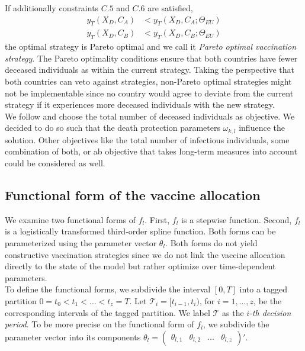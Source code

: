 If additionally constraints $C.5$ and $C.6$ are satisfied, 
\begin{align}
y_T(X_D, C_A) &< y_T(X_D, C_A; \Theta_{EU}) \tag{C.5} \\
y_T(X_D, C_B) &< y_T(X_D, C_B; \Theta_{EU}) \tag{C.6}
\end{align}
the optimal strategy is Pareto optimal and we call it \textit{Pareto optimal vaccination strategy}. The Pareto optimality conditions ensure that both countries have fewer deceased individuals as within the current strategy. Taking the perspective that both countries can veto against strategies, non-Pareto optimal strategies might not be implementable since no country would agree to deviate from the current strategy if it experiences more deceased individuals with the new strategy.\\

We follow \cite{Bertsimas.2020} and choose the total number of deceased individuals as objective. We decided to do so such that the death protection parameters $\omega_{k,l}$ influence the solution. Other objectives like the total number of infectious individuals, some combination of both, or ab objective that takes long-term measures into account could be considered as well.  \\

\subsection{Functional form of the vaccine allocation}
We examine two functional forms of $f_{l}$. First, $f_{l}$ is a stepwise function. Second, $f_{l}$ is a logistically transformed third-order spline function. Both forms can be parameterized using the parameter vector $\theta_l$. Both forms do not yield constructive vaccination strategies since we do not link the vaccine allocation directly to the state of the model but rather optimize over time-dependent parameters.\\

To define the functional forms, we subdivide the interval $[0,T]$ into a tagged partition $0=t_0 < t_1 < \dots < t_z = T$. Let $\mathcal{T}_i = [t_{i-1}, t_{i})$, for $i = 1, \dots, z$, be the corresponding intervals of the tagged partition. We label $\mathcal{T}$ as the $i$-\textit{th decision period}. To be more precise on the functional form of $f_l$, we subdivide the parameter vector into its components $\theta_l = \begin{pmatrix}
\theta_{l,1}  & \theta_{l,2} & \dots & \theta_{l,z} \end{pmatrix}'$. \\

